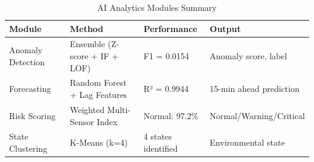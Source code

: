 \begin{table}[h]
\centering
\caption{AI Analytics Modules Summary}
\label{tab:ai_summary}
\begin{tabular}{l|p{4cm}|p{3cm}|p{3cm}}
\hline
\textbf{Module} & \textbf{Method} & \textbf{Performance} & \textbf{Output} \\
\hline
Anomaly Detection & Ensemble (Z-score + IF + LOF) & F1 = 0.0154 & Anomaly score, label \\
\hline
Forecasting & Random Forest + Lag Features & R² = 0.9944 & 15-min ahead prediction \\
\hline
Risk Scoring & Weighted Multi-Sensor Index & Normal: 97.2\% & Normal/Warning/Critical \\
\hline
State Clustering & K-Means (k=4) & 4 states identified & Environmental state \\
\hline
\end{tabular}
\end{table}